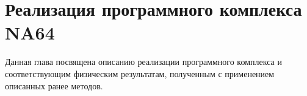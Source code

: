 \chapter{Реализация программного комплекса NA64}

Данная глава посвящена описанию реализации
программного комплекса и соответствующим физическим результатам,
полученным с применением описанных ранее методов.

\begin{comment}
Реконструкция данных представляет собой преобразование
сигналов детекторов в рамках одной и той же согласованной модели,
с применением калибровочной информации.

Применение конкурирующих численных методов и их динамическая композиция
могут быть обобщены в рамках машины конечных состояний, которые применяются,
в частности, к задаче аппроксимации амплитудной функции сигналов калориметров
или реконструкции треков с проверкой конкурирующих гипотез.

С практической точки зрения, многие элементарные
варианты использования могут быть эффективно обобщены
в рамках специализированных выразительных средств (искусственных
языков). В частности, они обеспечивают мощные
выразительные средства для повторяющихся задач:
выбор детекторов, запросы к модели события, описание калибровочных
данных.

Выбор форматов данных должен быть обоснован в рамках заданных
архитектурных инвариантов, фиксируя протоколы обмена данными между
основными компонентами.
\end{comment}










%


